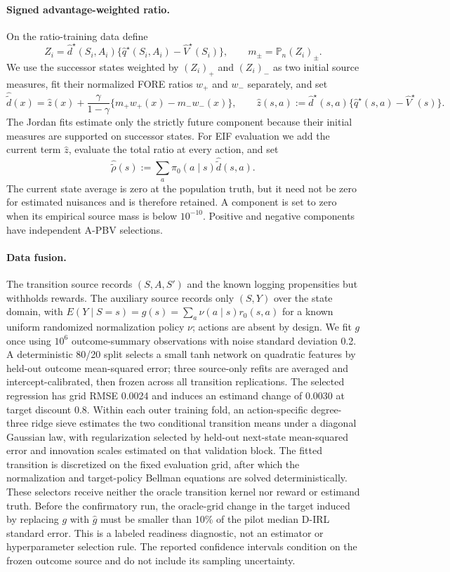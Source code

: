 \documentclass[11pt]{article}
\theoremstyle{plain}
\begin{document}
\paragraph{Signed advantage-weighted ratio.}
On the ratio-training data define
\[
Z_i=\widehat d^\star(S_i,A_i)
 \{\widehat q^\star(S_i,A_i)-\widehat V^\star(S_i)\},
\qquad
m_\pm=\mathbb P_n(Z_i)_\pm.
\]
We use the successor states weighted by $(Z_i)_+$ and $(Z_i)_-$ as two initial
source measures, fit their normalized FORE ratios $w_+$ and $w_-$ separately,
and set
\[
\widehat{\widetilde d}(x)
=\widehat z(x)
+\frac{\gamma}{1-\gamma}\{m_+w_+(x)-m_-w_-(x)\},
\qquad
\widehat z(s,a):=\widehat d^\star(s,a)
\{\widehat q^\star(s,a)-\widehat V^\star(s)\}.
\]
The Jordan fits estimate only the strictly future component because their
initial measures are supported on successor states. For EIF evaluation we add
the current term \(\widehat z\), evaluate the total ratio at every action, and
set
\[
\widehat{\widetilde\rho}(s)
:=\sum_a\widehat\pi_0(a\mid s)\widehat{\widetilde d}(s,a).
\]
The current state average is zero at the population truth, but it need not be
zero for estimated nuisances and is therefore retained.
A component is set to zero when its empirical source mass is below $10^{-10}$.
Positive and negative components have independent A-PBV selections.

\paragraph{Data fusion.}
The transition source records $(S,A,S')$ and the known logging propensities but
withholds rewards. The auxiliary source records only $(S,Y)$ over the state
domain, with
$E(Y\mid S=s)=g(s)=\sum_a\nu(a\mid s)r_0(s,a)$ for a known uniform randomized
normalization policy $\nu$; actions are absent by design. We fit $g$ once using
$10^6$ outcome-summary observations with noise standard deviation 0.2. A
deterministic 80/20 split selects a small tanh network on quadratic features by
held-out outcome mean-squared error; three source-only refits are averaged and
intercept-calibrated, then frozen across all transition replications. The
selected regression has grid RMSE 0.0024 and induces an estimand change of
0.0030 at target discount 0.8. Within each outer training fold, an
action-specific degree-three ridge sieve estimates the two conditional
transition means under a diagonal Gaussian law, with regularization selected by
held-out next-state mean-squared error and innovation scales estimated on that
validation block. The fitted transition is discretized on the fixed evaluation
grid, after which the normalization and target-policy Bellman equations are
solved deterministically. These selectors receive neither the oracle transition
kernel nor reward or estimand truth. Before the
confirmatory run, the oracle-grid change in the target induced by replacing
$g$ with $\widehat g$ must be smaller than 10\% of the pilot median D-IRL
standard error. This is a labeled readiness diagnostic, not an estimator or
hyperparameter selection rule. The reported confidence intervals condition on
the frozen outcome source and do not include its sampling uncertainty.
\end{document}
